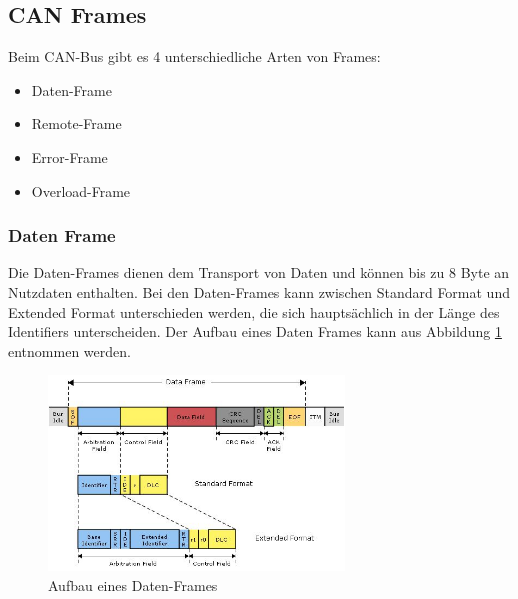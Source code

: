 \subsection{CAN Frames} Beim CAN-Bus gibt es 4 unterschiedliche Arten
von Frames: 
\begin{itemize} 
\item Daten-Frame 
\item Remote-Frame 
\item Error-Frame 
\item Overload-Frame 
\end{itemize} 

\subsubsection{Daten Frame} 
Die Daten-Frames dienen dem Transport von Daten und können bis
zu 8 Byte an Nutzdaten enthalten. Bei den Daten-Frames kann zwischen
Standard Format und Extended Format unterschieden werden, die sich
hauptsächlich in der Länge des Identifiers unterscheiden. Der Aufbau
eines Daten Frames kann aus Abbildung \ref{data} entnommen werden.
	
\begin{figure}[htbp] 
\centering
\includegraphics[width=0.7\textwidth]{figures/data-frame}
\caption{Aufbau eines Daten-Frames \citep{HYC}} 
\label{data}
\end{figure} 
		
